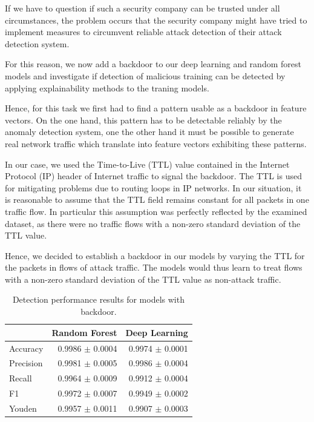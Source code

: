 \documentclass[sigconf,nonacm]{acmart}
\begin{document}
If we have to question if such a security company can be trusted under all circumstances, the problem occurs that the security company might have tried to implement measures to circumvent reliable attack detection of their attack detection system. 

For this reason, we now add a backdoor to our deep learning and random forest models and investigate if detection of malicious training can be detected by applying explainability methods to the traning models.

Hence, for this task we first had to find a pattern usable as a backdoor in feature vectors. On the one hand, this pattern has to be detectable reliably by the anomaly detection system, one the other hand it must be possible to generate real network traffic which translate into feature vectors exhibiting these patterns.

In our case, we used the Time-to-Live (TTL) value contained in the Internet Protocol (IP) header of Internet traffic to signal the backdoor. The TTL is used for mitigating problems due to routing loops in IP networks. In our situation, it is reasonable to assume that the TTL field remains constant for all packets in one traffic flow. In particular this assumption was perfectly reflected by the examined dataset, as there were no traffic flows with a non-zero standard deviation of the TTL value.

Hence, we decided to establish a backdoor in our models by varying the TTL for the packets in flows of attack traffic.  The models would thus learn to treat flows with a non-zero standard deviation of the TTL value as non-attack traffic.

\begin{table}
\caption{Detection performance results for models with backdoor.} 
\label{tab:performance_results_bd}
\begin{tabular}{l r r} \toprule
& Random Forest & Deep Learning \\ \midrule
Accuracy	&	0.9986 $\pm$ 0.0004	&	0.9974 $\pm$ 0.0001		\\
Precision	&	0.9981 $\pm$ 0.0005	&	0.9986 $\pm$ 0.0004		\\
Recall	&	0.9964 $\pm$ 0.0009	&	0.9912 $\pm$ 0.0004		\\
F1	&	0.9972 $\pm$ 0.0007	&	0.9949 $\pm$ 0.0002		\\
Youden	&	0.9957 $\pm$ 0.0011	&	0.9907 $\pm$ 0.0003		\\
\bottomrule
\end{tabular}
\end{table}
\end{document}
